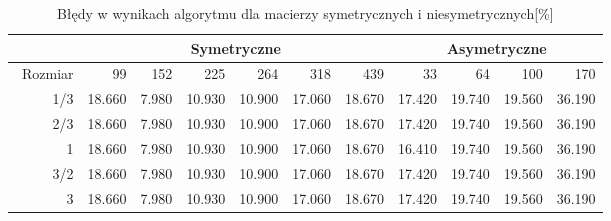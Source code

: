 \begin{table}
\centering
\begin{tabular}{|r|r|r|r|r|r|r|r|r|r|r|}
\hline
 & \multicolumn{6}{|c|}{Symetryczne} & \multicolumn{4}{|c|}{Asymetryczne} \\ \hline\
Rozmiar & 99 & 152 & 225 & 264 & 318 & 439 & 33 & 64 & 100 & 170 \\ \hline
1/3 & 18.660 & 7.980 & 10.930 & 10.900 & 17.060 & 18.670 & 17.420 & 19.740 & 19.560 & 36.190 \\
2/3 & 18.660 & 7.980 & 10.930 & 10.900 & 17.060 & 18.670 & 17.420 & 19.740 & 19.560 & 36.190 \\
1 & 18.660 & 7.980 & 10.930 & 10.900 & 17.060 & 18.670 & 16.410 & 19.740 & 19.560 & 36.190 \\
3/2 & 18.660 & 7.980 & 10.930 & 10.900 & 17.060 & 18.670 & 17.420 & 19.740 & 19.560 & 36.190 \\
3 & 18.660 & 7.980 & 10.930 & 10.900 & 17.060 & 18.670 & 17.420 & 19.740 & 19.560 & 36.190 \\ \hline
\end{tabular}
\caption{Błędy w wynikach algorytmu dla macierzy symetrycznych i niesymetrycznych[\%]}
\label{tab:error_AoAB}
\end{table}
